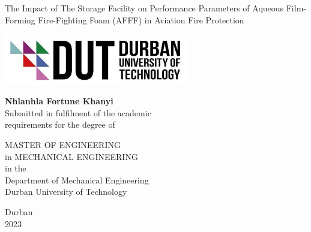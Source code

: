 \begin{titlepage}
\begin{center}

\doublespacing
\vspace*{1cm}

\large
The Impact of The Storage Facility on Performance Parameters of Aqueous Film-Forming Fire-Fighting Foam (AFFF) in Aviation Fire Protection

\vspace{2cm}

\includegraphics[width=0.6\textwidth]{images/logo.png}

\Large
\textbf{Nhlanhla Fortune Khanyi} \\

\large
Submitted in fulfilment of the academic\\
requirements for the degree of

\vspace{1.5cm}

MASTER OF ENGINEERING \\
in MECHANICAL ENGINEERING \\
in the \\

Department of Mechanical Engineering \\
Durban University of Technology

\vspace{1cm}

\normalsize
Durban \\
2023

\end{center}
\end{titlepage}